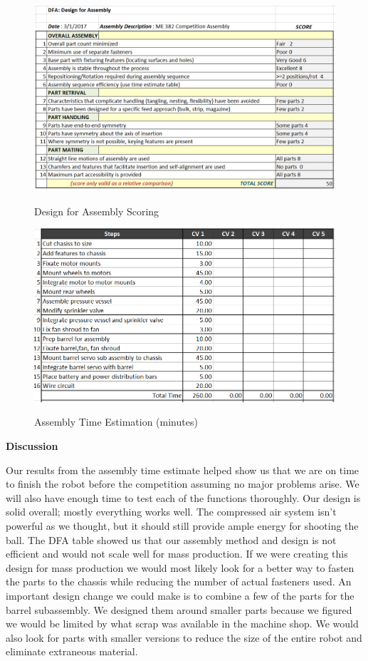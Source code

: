 \documentclass[12pt,letterpaper,titlepage]{article}
\begin{document}
\begin{figure}[H]
	\centering
	\includegraphics[width=5.25in]{images/DFA}
	\label{fig:DFA}
	\caption{Design for Assembly Scoring}
\end{figure}

\begin{figure}[H]
	\centering
	\includegraphics[width=5.25in]{images/AssemTime}
	\label{fig:AssemTime}
	\caption{Assembly Time Estimation (minutes)}
\end{figure}

\smallskip\noindent\textbf{Discussion}

Our results from the assembly time estimate helped show us that we are on time to finish the robot before the competition assuming no major problems arise. We will also have enough time to test each of the functions thoroughly. Our design is solid overall; mostly everything works well. The compressed air system isn't powerful as we thought, but it should still provide ample energy for shooting the ball. The DFA table showed us that our assembly method and design is not efficient and would not scale well for mass production. If we were creating this design for mass production we would most likely look for a better way to fasten the parts to the chassis while reducing the number of actual fasteners used. An important design change we could make is to combine a few of the parts for the barrel subassembly. We designed them around smaller parts because we figured we would be limited by what scrap was available in the machine shop. We would also look for parts with smaller versions to reduce the size of the entire robot and eliminate extraneous material.
\end{document}
